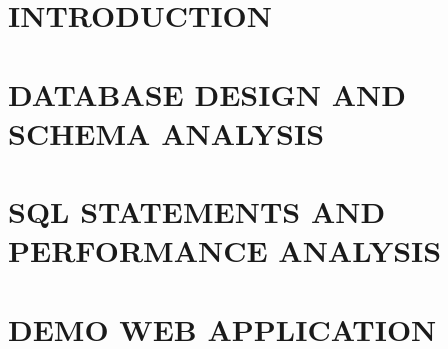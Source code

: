 \documentclass[a4paper,13pt,3p,twoside,openany]{report}
\theoremstyle{definition}
\begin{document}
\renewcommand{\listtablename}{LIST OF TABLES}
{\let\oldnumberline\numberline
\renewcommand{\numberline}{Table~\oldnumberline}
\listoftables}

\glsaddall 
\renewcommand*{\acronymname}{LIST OF ABBREVIATIONS}
\renewcommand*{\entryname}{Abbreviation}
\renewcommand*{\descriptionname}{Definition}

\printnoidxglossary[type=\acronymtype] %


\renewcommand{\figurename}{Figure}
\renewcommand{\tablename}{Table}
\renewcommand{\chaptername}{CHAPTER}



\newpage
\hypersetup{linkcolor=blue}

\pagestyle{fancy}
\fancyhf{}
\fancyhead[LE, RO]{\leftmark}
\fancyfoot[LE, RO]{\thepage}

\chapter{INTRODUCTION}

\newpage
\chapter{DATABASE DESIGN AND SCHEMA ANALYSIS}


\newpage
\chapter{SQL STATEMENTS AND PERFORMANCE ANALYSIS}


\newpage
\chapter{DEMO WEB APPLICATION}

\end{document}
